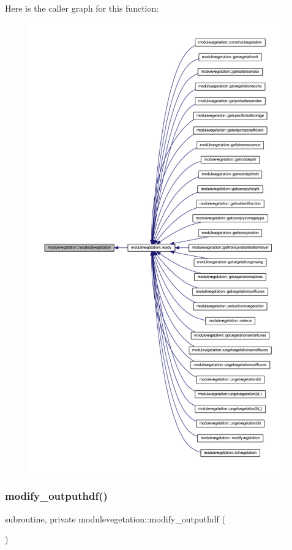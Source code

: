 Here is the caller graph for this function\+:\nopagebreak
\begin{figure}[H]
\begin{center}
\leavevmode
\includegraphics[height=550pt]{namespacemodulevegetation_ac457b656dd70c067c1609578542d0d16_icgraph}
\end{center}
\end{figure}
\mbox{\label{namespacemodulevegetation_ae3c35b12a954295511c0439076c44694}} 
\subsubsection{\texorpdfstring{modify\+\_\+outputhdf()}{modify\_outputhdf()}}
{\footnotesize\ttfamily subroutine, private modulevegetation\+::modify\+\_\+outputhdf (\begin{DoxyParamCaption}{ }\end{DoxyParamCaption})\hspace{0.3cm}{\ttfamily [private]}}

